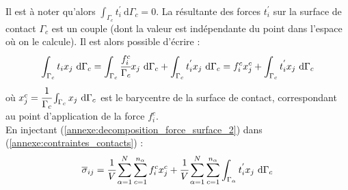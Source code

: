 \\Il est à noter qu'alors $\int_{\Gamma_c} t_i^{'}\ \mathrm{d}\Gamma_c = 0$. La résultante des forces $t_i^{'}$ sur la surface de contact $\Gamma_c$ est un couple (dont la valeur est indépendante du point dans l'espace où on le calcule). Il est alors possible d'écrire :
\begin{equation}\label{annexe:decomposition_force_surface_2}
	\int_{\Gamma_c}t_i x_j\ \mathrm{d}\Gamma_c
	= \int_{\Gamma_c} \cfrac{f_i^c}{\Gamma_c} x_j\ \mathrm{d}\Gamma_c + \int_{\Gamma_c} t_i^{'} x_j\ \mathrm{d}\Gamma_c
	= f_i^c x_j^c + \int_{\Gamma_c} t_i^{'} x_j\ \mathrm{d}\Gamma_c
\end{equation}
où $x_j^c = \cfrac{1}{\Gamma_c} \int_{\Gamma_c} x_j\ \mathrm{d} \Gamma_c$ est le barycentre de la surface de contact, correspondant au point d'application de la force $f_i^c$.
\\En injectant (\ref{annexe:decomposition_force_surface_2}) dans (\ref{annexe:contraintes_contacts}) :
\begin{equation}\label{annexe:contraintes_final}
	\overline{\sigma}_{ij}
	= \cfrac{1}{V} \sum_{\alpha=1}^N \sum_{c=1}^{n_\alpha} f_i^c x_j^c + \cfrac{1}{V} \sum_{\alpha=1}^N \sum_{c=1}^{n_\alpha} \int_{\Gamma_\alpha} t_i^{'} x_j\ \mathrm{d} \Gamma_c
\end{equation}

